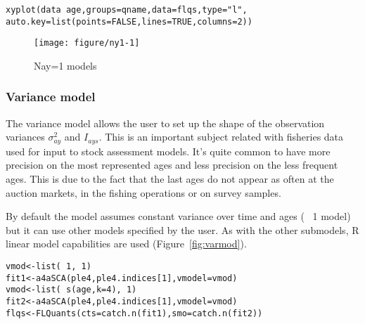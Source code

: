 \documentclass[a4paper,english,10pt]{article}\usepackage[]{graphicx}\usepackage[]{color}
\makeatletter
\def\maxwidth{ %
  \ifdim\Gin@nat@width>\linewidth
    \linewidth
  \else
    \Gin@nat@width
  \fi
}
\newcommand{\hlnum}[1]{\textcolor[rgb]{0.2,0.2,0.2}{#1}}%
\newcommand{\hlstr}[1]{\textcolor[rgb]{0.2,0.2,0.2}{#1}}%
\newcommand{\hlopt}[1]{\textcolor[rgb]{0.2,0.2,0.2}{#1}}%
\newcommand{\hlstd}[1]{\textcolor[rgb]{0,0,0}{#1}}%
\newcommand{\hlkwb}[1]{\textcolor[rgb]{0.361,0.506,0.596}{#1}}%
\newcommand{\hlkwc}[1]{\textcolor[rgb]{0.361,0.506,0.596}{#1}}%
\newcommand{\hlkwd}[1]{\textcolor[rgb]{0.361,0.506,0.596}{#1}}%
\newenvironment{kframe}{%
 \def\at@end@of@kframe{}%
 \ifinner\ifhmode%
  \def\at@end@of@kframe{\end{minipage}}%
  \begin{minipage}{\columnwidth}%
 \fi\fi%
 \def\FrameCommand##1{\hskip\@totalleftmargin \hskip-\fboxsep
 \colorbox{shadecolor}{##1}\hskip-\fboxsep
     \hskip-\linewidth \hskip-\@totalleftmargin \hskip\columnwidth}%
 \MakeFramed {\advance\hsize-\width
   \@totalleftmargin\z@ \linewidth\hsize
   \@setminipage}}%
 {\par\unskip\endMakeFramed%
 \at@end@of@kframe}
\newenvironment{knitrout}{}{} %
\makeatother
\begin{document}
\begin{knitrout}
\color{fgcolor}\begin{kframe}
\begin{alltt}
\hlkwd{xyplot}\hlstd{(data}\hlopt{~}\hlstd{age,} \hlkwc{groups}\hlstd{=qname,} \hlkwc{data}\hlstd{=flqs,} \hlkwc{type}\hlstd{=}\hlstr{"l"}\hlstd{,}
       \hlkwc{auto.key}\hlstd{=}\hlkwd{list}\hlstd{(}\hlkwc{points}\hlstd{=}\hlnum{FALSE}\hlstd{,} \hlkwc{lines}\hlstd{=}\hlnum{TRUE}\hlstd{,} \hlkwc{columns}\hlstd{=}\hlnum{2}\hlstd{))}
\end{alltt}
\end{kframe}\begin{figure}[H]

{\centering \texttt{[image: figure/ny1-1]} 

}

\caption[Nay=1 models]{Nay=1 models}\label{fig:ny1}
\end{figure}


\end{knitrout}

\subsubsection{Variance model}

The variance model allows the user to set up the shape of the observation variances $\sigma^2_{ay}$ and $I_{ays}$. This is an important subject related with fisheries data used for input to stock assessment models. It's quite common to have more precision on the most represented ages and less precision on the less frequent ages. This is due to the fact that the last ages do not appear as often at the auction markets, in the fishing operations or on survey samples.

By default the model assumes constant variance over time and ages (~ 1 model) but it can use other models specified by the user. As with the other submodels, R linear model capabilities are used (Figure~\ref{fig:varmod}).

\begin{knitrout}
\color{fgcolor}\begin{kframe}
\begin{alltt}
\hlstd{vmod} \hlkwb{<-} \hlkwd{list}\hlstd{(}\hlopt{~}\hlnum{1}\hlstd{,} \hlopt{~}\hlnum{1}\hlstd{)}
\hlstd{fit1} \hlkwb{<-} \hlkwd{a4aSCA}\hlstd{(ple4, ple4.indices[}\hlnum{1}\hlstd{],} \hlkwc{vmodel}\hlstd{=vmod)}
\hlstd{vmod} \hlkwb{<-} \hlkwd{list}\hlstd{(}\hlopt{~} \hlkwd{s}\hlstd{(age,} \hlkwc{k}\hlstd{=}\hlnum{4}\hlstd{),} \hlopt{~}\hlnum{1}\hlstd{)}
\hlstd{fit2} \hlkwb{<-} \hlkwd{a4aSCA}\hlstd{(ple4, ple4.indices[}\hlnum{1}\hlstd{],} \hlkwc{vmodel}\hlstd{=vmod)}
\hlstd{flqs} \hlkwb{<-} \hlkwd{FLQuants}\hlstd{(}\hlkwc{cts}\hlstd{=}\hlkwd{catch.n}\hlstd{(fit1),} \hlkwc{smo}\hlstd{=}\hlkwd{catch.n}\hlstd{(fit2))}
\end{alltt}
\end{kframe}
\end{knitrout}
\end{document}
